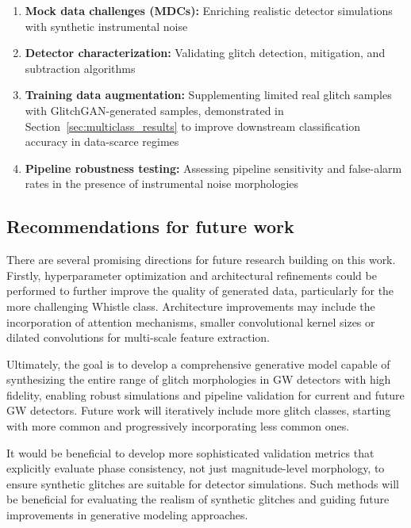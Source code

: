 \documentclass[reprint,nofootinbib,amsmath,amssymb,aps,floatfix]{revtex4-2}
\begin{document}
\begin{enumerate}
\item
\textbf{Mock data challenges (MDCs):} Enriching realistic detector simulations with synthetic instrumental noise

\item
\textbf{Detector characterization:} Validating glitch detection, mitigation, and subtraction algorithms

\item
\textbf{Training data augmentation:} Supplementing limited real glitch samples with GlitchGAN-generated samples, demonstrated in Section~\ref{sec:multiclass_results} to improve downstream classification accuracy in data-scarce regimes

\item
\textbf{Pipeline robustness testing:} Assessing pipeline sensitivity and false-alarm rates in the presence of instrumental noise morphologies
\end{enumerate}

\subsection{Recommendations for future work}

There are several promising directions for future research building on this work. Firstly, hyperparameter optimization and architectural refinements could be performed to further improve the quality of generated data, particularly for the more challenging Whistle class.
Architecture improvements may include the incorporation of attention mechanisms, smaller convolutional kernel sizes or dilated convolutions for multi-scale feature extraction.

Ultimately, the goal is to develop a comprehensive generative model capable of synthesizing the entire range of glitch morphologies in GW detectors with high fidelity, enabling robust simulations and pipeline validation for current and future GW detectors.
Future work will iteratively include more glitch classes, starting with more common and progressively incorporating less common ones.

It would be beneficial to develop more sophisticated validation metrics that explicitly evaluate phase consistency, not just magnitude-level morphology, to ensure synthetic glitches are suitable for detector simulations.
Such methods will be beneficial for evaluating the realism of synthetic glitches and guiding future improvements in generative modeling approaches.
\end{document}

